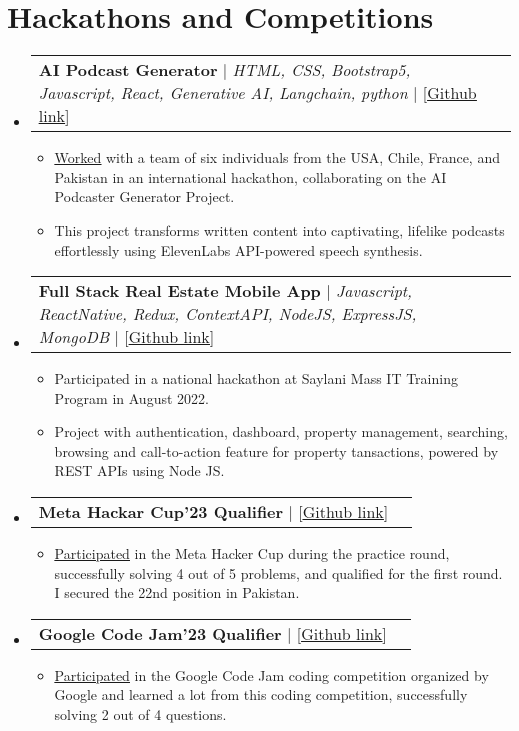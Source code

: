 \documentclass[letterpaper,11pt]{article}
\makeatletter
\newcommand{\resumeItem}[1]{
  \item\small{
    {#1 \vspace{-2pt}}
  }
}
\newcommand{\resumeProjectHeading}[2]{
    \item
    \begin{tabular*}{0.97\textwidth}{l@{\extracolsep{\fill}}r}
      \small#1 & #2 \\
    \end{tabular*}\vspace{-7pt}
}
\newcommand{\resumeSubHeadingListStart}{\begin{itemize}[leftmargin=0.15in, label={}]}
\newcommand{\resumeSubHeadingListEnd}{\end{itemize}}
\newcommand{\resumeItemListStart}{\begin{itemize}}
\newcommand{\resumeItemListEnd}{\end{itemize}\vspace{-5pt}}
\makeatother
\begin{document}
\section{Hackathons and Competitions}
\resumeSubHeadingListStart
\resumeProjectHeading
{\textbf{{AI Podcast Generator}} $|$ \emph{HTML, CSS, Bootstrap5, Javascript, React, Generative AI, Langchain, python} $|$ [{\href{https://github.com/Louvivien/AIpodcastgenerator}{\underline{Github link}}}]} {}
\resumeItemListStart
\resumeItem{{\href{https://www.linkedin.com/posts/ahmad-jajja_hackathon2023-aipodcastgenerator-exploration-activity-7093927753724379136-gfKF?utm_source=share&utm_medium=member_desktop}{\underline{Worked}}} with a team of six individuals from the USA, Chile, France, and Pakistan in an international hackathon, collaborating on the AI Podcaster Generator Project.}
\resumeItem{This project transforms written content into captivating, lifelike podcasts effortlessly using ElevenLabs API-powered speech synthesis.}
\resumeItemListEnd
\resumeProjectHeading
{\textbf{{Full Stack Real Estate Mobile App}} $|$ \emph{Javascript, ReactNative, Redux, ContextAPI, NodeJS,
    ExpressJS, MongoDB} $|$ [{\href{https://github.com/Ahmadjajja/Social_Real_Estate_System_Mobile_App_Frontend}{\underline{Github link}}}]}{}
\resumeItemListStart
\resumeItem{Participated in a national hackathon at Saylani Mass IT Training Program in August 2022.}
\resumeItem{Project with authentication, dashboard, property
  management, searching, browsing and call-to-action feature for property
  tansactions, powered by REST APIs using Node JS.}
\resumeItemListEnd
\resumeProjectHeading
{\textbf{{Meta Hackar Cup'23 Qualifier}} $|$ [{\href{https://github.com/Ahmadjajja/MetaHackerCup2023}{\underline{Github link}}}]}{}
\resumeItemListStart
\resumeItem{{\href{https://www.linkedin.com/posts/ahmad-jajja_metahackercup-teamwork-learningexperience-activity-7112279898903212033-UtWm?utm_source=share&utm_medium=member_desktop}{\underline{Participated}}} in the Meta Hacker Cup during the practice round, successfully solving 4 out of 5 problems, and qualified for the first round. I secured the 22nd position in Pakistan.}
\resumeItemListEnd
\resumeProjectHeading
{\textbf{{Google Code Jam'23 Qualifier}} $|$ [{\href{https://github.com/Ahmadjajja/googleCodeJam2023}{\underline{Github link}}}]}{}
\resumeItemListStart
\resumeItem{{\href{https://www.linkedin.com/posts/ahmad-jajja_codingcompetition-codingchallenge-activity-7053083509342576640-4Fjq?utm_source=share&utm_medium=member_desktop}{\underline{Participated}}} in the Google Code Jam coding competition organized by Google and learned a lot from this coding competition, successfully solving 2 out of 4 questions.}
\resumeItemListEnd
\resumeSubHeadingListEnd
%
\end{document}

